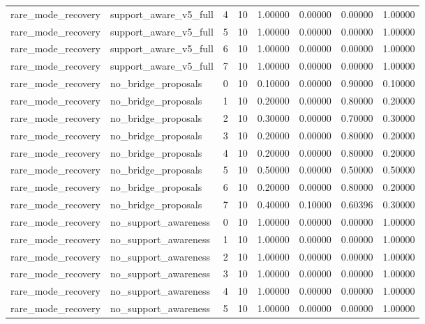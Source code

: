 \documentclass{article}
\begin{document}
\begin{table}[tbp]
{\begin{tabular}{llllllll}
rare\_mode\_recovery & support\_aware\_v5\_full & 4 & 10 & 1.00000 & 0.00000 & 0.00000 & 1.00000 \\
rare\_mode\_recovery & support\_aware\_v5\_full & 5 & 10 & 1.00000 & 0.00000 & 0.00000 & 1.00000 \\
rare\_mode\_recovery & support\_aware\_v5\_full & 6 & 10 & 1.00000 & 0.00000 & 0.00000 & 1.00000 \\
rare\_mode\_recovery & support\_aware\_v5\_full & 7 & 10 & 1.00000 & 0.00000 & 0.00000 & 1.00000 \\
rare\_mode\_recovery & no\_bridge\_proposals & 0 & 10 & 0.10000 & 0.00000 & 0.90000 & 0.10000 \\
rare\_mode\_recovery & no\_bridge\_proposals & 1 & 10 & 0.20000 & 0.00000 & 0.80000 & 0.20000 \\
rare\_mode\_recovery & no\_bridge\_proposals & 2 & 10 & 0.30000 & 0.00000 & 0.70000 & 0.30000 \\
rare\_mode\_recovery & no\_bridge\_proposals & 3 & 10 & 0.20000 & 0.00000 & 0.80000 & 0.20000 \\
rare\_mode\_recovery & no\_bridge\_proposals & 4 & 10 & 0.20000 & 0.00000 & 0.80000 & 0.20000 \\
rare\_mode\_recovery & no\_bridge\_proposals & 5 & 10 & 0.50000 & 0.00000 & 0.50000 & 0.50000 \\
rare\_mode\_recovery & no\_bridge\_proposals & 6 & 10 & 0.20000 & 0.00000 & 0.80000 & 0.20000 \\
rare\_mode\_recovery & no\_bridge\_proposals & 7 & 10 & 0.40000 & 0.10000 & 0.60396 & 0.30000 \\
rare\_mode\_recovery & no\_support\_awareness & 0 & 10 & 1.00000 & 0.00000 & 0.00000 & 1.00000 \\
rare\_mode\_recovery & no\_support\_awareness & 1 & 10 & 1.00000 & 0.00000 & 0.00000 & 1.00000 \\
rare\_mode\_recovery & no\_support\_awareness & 2 & 10 & 1.00000 & 0.00000 & 0.00000 & 1.00000 \\
rare\_mode\_recovery & no\_support\_awareness & 3 & 10 & 1.00000 & 0.00000 & 0.00000 & 1.00000 \\
rare\_mode\_recovery & no\_support\_awareness & 4 & 10 & 1.00000 & 0.00000 & 0.00000 & 1.00000 \\
rare\_mode\_recovery & no\_support\_awareness & 5 & 10 & 1.00000 & 0.00000 & 0.00000 & 1.00000 \\
\bottomrule
\end{tabular}
}
\end{table}
\end{document}
